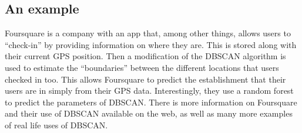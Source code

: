   \subsection{An example}
  Foursquare is a company with an app that, among other things, allows users to ``check-in'' by providing information on where they are. This is stored along with their current GPS position.
  Then a modification of the DBSCAN algorithm is used to estimate the ``boundaries'' between the different locations that users checked in too. This allows Foursquare to predict the establishment that
  their users are in simply from their GPS data. Interestingly, they use a random forest to predict the parameters of DBSCAN. There is more information on Foursquare and their use of
  DBSCAN available on the web, as well as many more examples of real life uses of DBSCAN.
